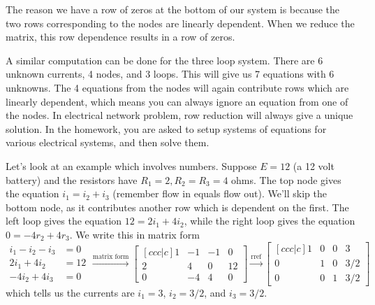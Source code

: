 The reason we have a row of zeros at the bottom of our system is because the two rows corresponding to the nodes are linearly dependent.  
When we reduce the matrix, this row dependence results in a row of zeros.

A similar computation can be done for the three loop system. 
There are 6 unknown currents, 4 nodes, and 3 loops.  
This will give us 7 equations with 6 unknowns.  
The 4 equations from the nodes will again contribute rows which are linearly dependent, which means you can always ignore an equation from one of the nodes. 
In electrical network problem, row reduction will always give a unique solution. 
In the homework, you are asked to setup systems of equations for various electrical systems, and then solve them. 


\begin{example} \label{electrical example}Let's look at an example which involves numbers.  Suppose $E=12$ (a 12 volt battery) and the resistors have $R_1=2, R_2=R_3=4$ ohms. The top node gives the equation $i_1=i_2+i_3$ (remember flow in equals flow out). We'll skip the bottom node, as it contributes another row which is dependent on the first.  The left loop gives the equation $12 = 2i_1+4i_2$, while the right loop gives the equation $0=-4r_2+4r_3$.  We write this in matrix form
$$
\begin{array}{rl}
i_1-i_2-i_3&=0\\
2i_1+4i_2&=12\\
-4 i_2 +4i_3&=0
\end{array}
\xrightarrow{\text{matrix form}}
\begin{bmatrix}[ccc|c]
1&-1&-1&0\\
2&4&0&12\\
0&-4&4&0
\end{bmatrix}
\xrightarrow{\text{rref}}
\begin{bmatrix}[ccc|c]
 1 & 0 & 0 & 3\\
 0 & 1 & 0 & 3/2\\
 0 & 0 & 1 & 3/2
\end{bmatrix}
$$
which tells us the currents are $i_1=3$, $i_2=3/2$, and $i_3=3/2$.
\end{example}






